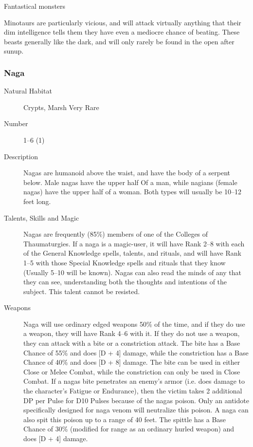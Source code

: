 \begin{mmgroup}{Fantastical monsters}
\begin{mmcomment}
  Minotaurs are particularly vicious, and will attack
virtually anything that their dim intelligence tells them they have
even a mediocre chance of beating. These beasts generally like
the dark, and will only rarely be found in the open after sunup.
\end{mmcomment}

\subsubsection{Naga}

\begin{description}
\item[Natural Habitat] Crypts, Marsh  Very Rare

\item[Number] 1–6 (1)

\item[Description]  Nagas are humanoid above the waist, and have
the body of a serpent below. Male nagas have the upper half Of
a man, while nagians (female nagas) have the upper half of a
woman. Both types will usually be 10–12 feet long.

\item[Talents, Skills and Magic] Nagas are frequently (85\%) members of one of the Colleges of
Thaumaturgies. If a naga is a magic-user, it will have Rank 2–8 with
each of the General Knowledge spells, talents, and rituals, and will
have Rank 1–5 with those Special Knowledge spells and rituals that
they know (Usually 5–10 will be known). Nagas can also read the minds
of any that they can see, understanding both the thoughts and
intentions of the subject. This talent cannot be resisted.

\item[Weapons] Naga will use ordinary edged weapons 50\% of the time, and if
they do use a weapon, they will have Rank 4–6 with it. If they do not
use a weapon, they can attack with a bite or a constriction
attack. The bite has a Base Chance of 55\% and does [D + 4] damage,
while the constriction has a Base Chance of 40\% and does [D + 8]
damage. The bite can be used in either Close or Melee Combat, while
the constriction can only be used in Close Combat. If a nagas bite
penetrates an enemy's armor (i.e. does damage to the character's
Fatigue or Endurance), then the victim takes 2 additional DP per Pulse
for D10 Pulses because of the nagas poison. Only an antidote
specifically designed for naga venom will neutralize this poison. A
naga can also spit this poison up to a range of 40 feet. The spittle
has a Base Chance of 30\% (modified for range as an ordinary hurled
weapon) and does [D + 4] damage.


\end{description}
\end{mmgroup}
